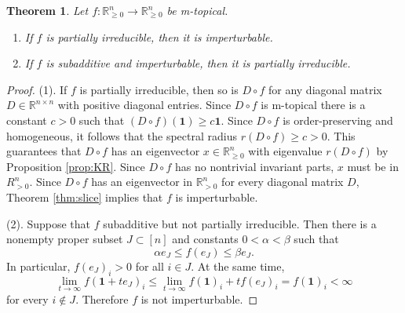 \documentclass[10pt,reqno]{amsart}
\newcommand{\R}{\mathbb{R}}
\newcommand{\on}{\operatorname}
\newcommand{\bs}{\setminus}
\theoremstyle{plain}
\newtheorem{theorem}{Theorem}[section]
\theoremstyle{definition}
\numberwithin{equation}{section}
\begin{document}
\begin{theorem} \label{thm:connect2}
Let $f:\R^n_{\ge 0} \rightarrow \R^n_{\ge 0}$ be m-topical. 
\begin{enumerate}
\item If $f$ is partially irreducible, then it is imperturbable.
\item If $f$ is subadditive and imperturbable, then it is partially irreducible.
\end{enumerate}
\end{theorem}
\begin{proof}
(1). If $f$ is partially irreducible, then so is $D \circ f$ for any diagonal matrix $D \in \R^{n \times n}$ with positive diagonal entries. Since $D \circ f$ is m-topical there is a constant $c > 0$ such that $(D \circ f)(\mathbf{1}) \ge c \mathbf{1}$.  Since $D \circ f$ is order-preserving and homogeneous, it follows that the spectral radius $r(D \circ f) \ge c > 0$.  This guarantees that $D \circ f$ has an eigenvector $x \in \R^n_{\ge 0}$ with eigenvalue $r(D \circ f)$ by Proposition \ref{prop:KR}. Since $D \circ f$ has no nontrivial invariant parts, $x$ must be in $R^n_{>0}$.  Since $D \circ f$ has an eigenvector in $\R^n_{>0}$ for every diagonal matrix $D$, Theorem \ref{thm:slice} implies that $f$ is imperturbable. 

(2). Suppose that $f$ subadditive but not partially irreducible.  Then there is a nonempty proper subset $J \subset [n]$ and constants $0 < \alpha < \beta$ such that 
$$\alpha e_J \le f(e_J) \le \beta e_J.$$
In particular, $f(e_J)_i > 0$ for all $i \in J$.  At the same time, 
$$\lim_{t \rightarrow \infty} f(\mathbf{1} + t e_J)_i \le \lim_{t \rightarrow \infty} f(\mathbf{1})_i + t f(e_J)_i = f(\mathbf{1})_i < \infty$$
for every $i \notin J$.  Therefore $f$ is not imperturbable.
\end{proof}
\end{document}
